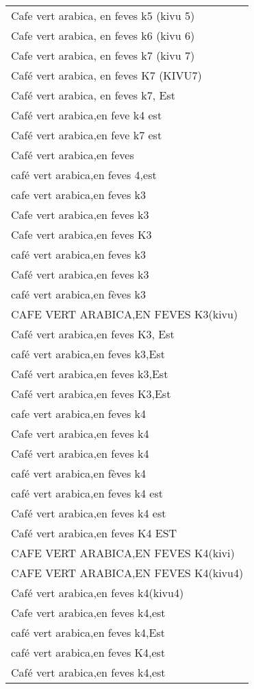 \documentclass[
]{book}
\begin{document}
\begin{longtable}[t]{l}
Cafe vert arabica, en feves k5 (kivu 5)\\
\addlinespace
Cafe vert arabica, en feves k6 (kivu 6)\\
Cafe vert arabica, en feves k7 (kivu 7)\\
Café vert arabica, en feves K7 (KIVU7)\\
Café vert arabica, en feves k7, Est\\
Café vert arabica,en feve k4 est\\
\addlinespace
Café vert arabica,en feve k7 est\\
Café vert arabica,en feves\\
café vert arabica,en feves 4,est\\
cafe vert arabica,en feves k3\\
Cafe vert arabica,en feves k3\\
\addlinespace
Cafe vert arabica,en feves K3\\
café vert arabica,en feves k3\\
Café vert arabica,en feves k3\\
café vert arabica,en fèves k3\\
CAFE VERT ARABICA,EN FEVES K3(kivu)\\
\addlinespace
Café vert arabica,en feves K3, Est\\
café vert arabica,en feves k3,Est\\
Café vert arabica,en feves k3,Est\\
Café vert arabica,en feves K3,Est\\
cafe vert arabica,en feves k4\\
\addlinespace
Cafe vert arabica,en feves k4\\
Café vert arabica,en feves k4\\
café vert arabica,en fèves k4\\
café vert arabica,en feves k4 est\\
Café vert arabica,en feves k4 est\\
\addlinespace
Café vert arabica,en feves K4 EST\\
CAFE VERT ARABICA,EN FEVES K4(kivi)\\
CAFE VERT ARABICA,EN FEVES K4(kivu4)\\
Café vert arabica,en feves k4(kivu4)\\
Cafe vert arabica,en feves k4,est\\
\addlinespace
café vert arabica,en feves k4,Est\\
café vert arabica,en feves K4,est\\
Café vert arabica,en feves k4,est\\

\end{longtable}
\end{document}
